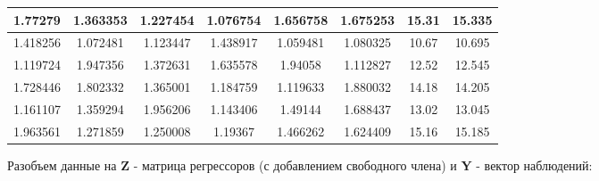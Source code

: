\begin{center}
\begin{tabular}{ | c | c | c | c | c | c | c | c | }
      \hline 
      1.77279 & 1.363353 & 1.227454 & 1.076754 & 1.656758 & 1.675253 & 15.31 & 15.335 \\ 
      \hline 
      1.418256 & 1.072481 & 1.123447 & 1.438917 & 1.059481 & 1.080325 & 10.67 & 10.695 \\ 
      \hline 
      1.119724 & 1.947356 & 1.372631 & 1.635578 & 1.94058 & 1.112827 & 12.52 & 12.545 \\ 
      \hline 
      1.728446 & 1.802332 & 1.365001 & 1.184759 & 1.119633 & 1.880032 & 14.18 & 14.205 \\ 
      \hline 
      1.161107 & 1.359294 & 1.956206 & 1.143406 & 1.49144 & 1.688437 & 13.02 & 13.045 \\ 
      \hline 
      1.963561 & 1.271859 & 1.250008 & 1.19367 & 1.466262 & 1.624409 & 15.16 & 15.185 \\ 
      \hline 
    \end{tabular}
\end{center}

Разобъем данные на \textrm{\textbf{Z}} - матрица регрессоров (с добавлением свободного члена) и \textrm{\textbf{Y}} - вектор наблюдений:

